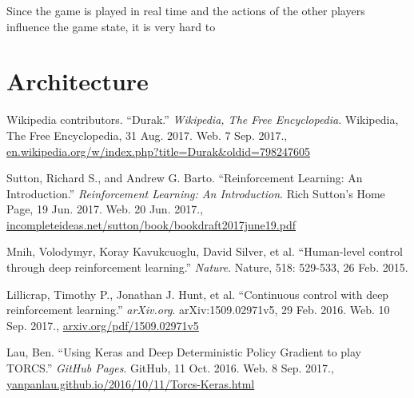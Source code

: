 \documentclass[a4paper,titlepage]{article}
\begin{document}
Since the game is played in real time and the actions of the other players influence the game state, it is very hard to 

\newpage

\section{Architecture}

\newpage

\begin{thebibliography}{9}

  Wikipedia contributors. ``Durak.'' \emph{Wikipedia, The Free Encyclopedia}. Wikipedia, The Free Encyclopedia, 31 Aug. 2017. Web.
  7 Sep. 2017., \\
  \url{en.wikipedia.org/w/index.php?title=Durak&oldid=798247605}

  Sutton, Richard S., and Andrew G. Barto. ``Reinforcement Learning: An Introduction.'' \emph{Reinforcement Learning: An Introduction}. Rich Sutton's Home Page, 19 Jun. 2017. Web.
  20 Jun. 2017., \\
  \url{incompleteideas.net/sutton/book/bookdraft2017june19.pdf}

  Mnih, Volodymyr, Koray Kavukcuoglu, David Silver, et al. ``Human-level control through deep reinforcement learning.'' \emph{Nature}. Nature, 518: 529-533, 26 Feb. 2015.

  Lillicrap, Timothy P., Jonathan J. Hunt, et al. ``Continuous control with deep reinforcement learning.'' \emph{arXiv.org}. arXiv:1509.02971v5, 29 Feb. 2016. Web.
  10 Sep. 2017., \url{arxiv.org/pdf/1509.02971v5}

  Lau, Ben. ``Using Keras and Deep Deterministic Policy Gradient to play TORCS.'' \emph{GitHub Pages}. GitHub, 11 Oct. 2016. Web.
  8 Sep. 2017., \\
  \url{yanpanlau.github.io/2016/10/11/Torcs-Keras.html}

\end{thebibliography}
\end{document}
